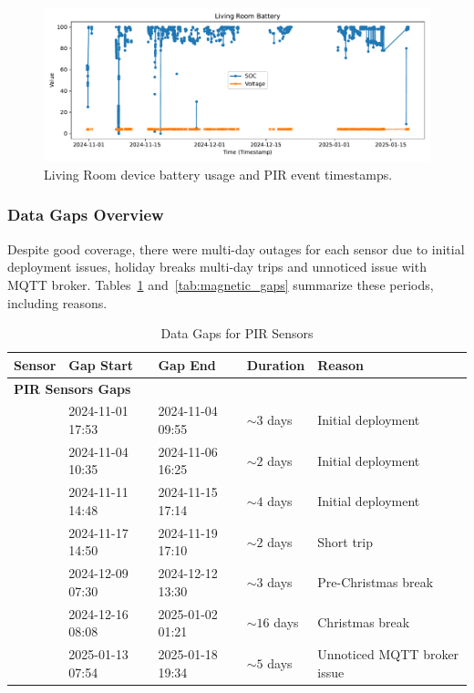 \documentclass[A4,10pt]{article}
\begin{document}
\begin{itemize}
    \begin{figure}[H]
        \centering
        \includegraphics[width=1.15\textwidth]{livingroom_battery.pdf}
        \caption{Living Room device battery usage and PIR event timestamps.}
        \label{fig:livingroom_battery}
    \end{figure}

	\subsubsection{Data Gaps Overview}
	\label{sec:data_gaps}
	
	Despite good coverage, there were multi-day outages for each sensor due to initial deployment issues, holiday breaks multi-day trips and unnoticed issue with MQTT broker. Tables~\ref{tab:pir_gaps} and~\ref{tab:magnetic_gaps} summarize these periods, including reasons.
	
	\begin{table}[ht!]
	\centering
	\caption{Data Gaps for PIR Sensors}
	\label{tab:pir_gaps}
	\begin{tabular}{lllll}
	\hline
	\textbf{Sensor}            & \textbf{Gap Start}      & \textbf{Gap End}       & \textbf{Duration} & \textbf{Reason}              \\
	\hline
	\multicolumn{5}{l}{\textbf{PIR Sensors Gaps}} \\
							   & 2024-11-01 17:53        & 2024-11-04 09:55       & $\sim3$ days      & Initial deployment           \\
							   & 2024-11-04 10:35        & 2024-11-06 16:25       & $\sim2$ days      & Initial deployment           \\
							   & 2024-11-11 14:48        & 2024-11-15 17:14       & $\sim4$ days      & Initial deployment           \\
							   & 2024-11-17 14:50        & 2024-11-19 17:10       & $\sim2$ days      & Short trip                   \\
							   & 2024-12-09 07:30        & 2024-12-12 13:30       & $\sim3$ days      & Pre-Christmas break          \\
							   & 2024-12-16 08:08        & 2025-01-02 01:21       & $\sim16$ days     & Christmas break              \\
							   & 2025-01-13 07:54        & 2025-01-18 19:34       & $\sim5$ days      & Unnoticed MQTT broker issue               \\
	\end{tabular}
	\end{table}
	

\end{itemize}
\end{document}
